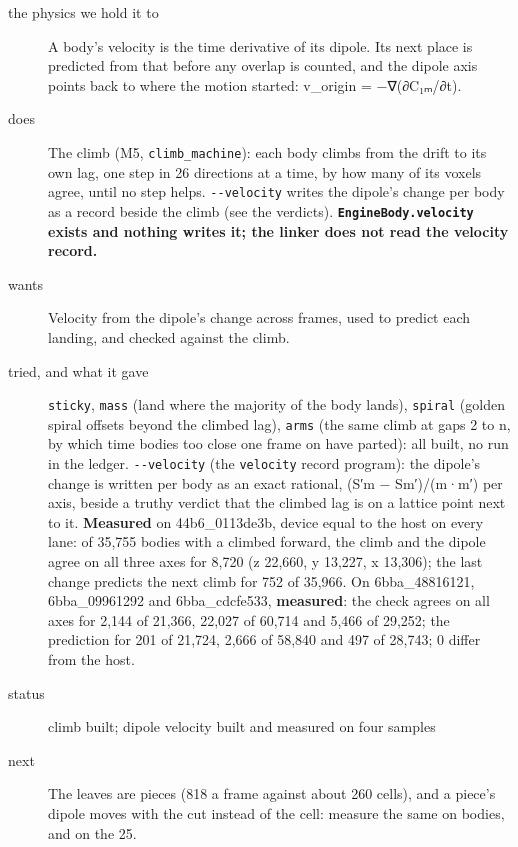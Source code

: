 \begin{description}
\item[{the physics we hold it to}] A body's velocity is the time derivative of its dipole. Its next place is predicted from that before any overlap is counted, and the dipole axis points back to where the motion started: v\_\allowbreak{}origin = −∇(∂C₁ₘ/∂t).
\item[{does}] The climb (M5, \texttt{climb\_\allowbreak{}machine}): each body climbs from the drift to its own lag, one step in 26 directions at a time, by how many of its voxels agree, until no step helps. \texttt{-\allowbreak{}-\allowbreak{}velocity} writes the dipole's change per body as a record beside the climb (see the verdicts). \textbf{\texttt{Engine\allowbreak{}Body.\allowbreak{}velocity} exists and nothing writes it; the linker does not read the velocity record.}
\item[{wants}] Velocity from the dipole's change across frames, used to predict each landing, and checked against the climb.
\item[{tried, and what it gave}] \texttt{sticky}, \texttt{mass} (land where the majority of the body lands), \texttt{spiral} (golden spiral offsets beyond the climbed lag), \texttt{arms} (the same climb at gaps 2 to n, by which time bodies too close one frame on have parted): all built, no run in the ledger. \texttt{-\allowbreak{}-\allowbreak{}velocity} (the \texttt{velocity} record program): the dipole's change is written per body as an exact rational, (S′m − Sm′)/(m·m′) per axis, beside a truthy verdict that the climbed lag is on a lattice point next to it. \textbf{Measured} on 44b6\_\allowbreak{}0113de3b, device equal to the host on every lane: of 35,755 bodies with a climbed forward, the climb and the dipole agree on all three axes for 8,720 (z 22,660, y 13,227, x 13,306); the last change predicts the next climb for 752 of 35,966. On 6bba\_\allowbreak{}48816121, 6bba\_\allowbreak{}09961292 and 6bba\_\allowbreak{}cdcfe533, \textbf{measured}: the check agrees on all axes for 2,144 of 21,366, 22,027 of 60,714 and 5,466 of 29,252; the prediction for 201 of 21,724, 2,666 of 58,840 and 497 of 28,743; 0 differ from the host.
\item[{status}] climb built; dipole velocity built and measured on four samples
\item[{next}] The leaves are pieces (818 a frame against about 260 cells), and a piece's dipole moves with the cut instead of the cell: measure the same on bodies, and on the 25.
\end{description}

